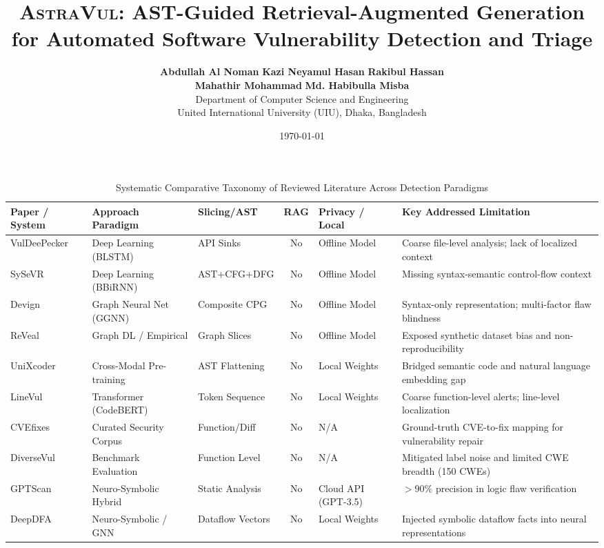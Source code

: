\documentclass[10pt,twocolumn]{article}
\title{\textbf{\Large \textsc{AstraVul}: AST-Guided Retrieval-Augmented Generation for Automated Software Vulnerability Detection and Triage}}
\author{
    \textbf{Abdullah Al Noman} \quad \textbf{Kazi Neyamul Hasan} \quad \textbf{Rakibul Hassan}\\
    \textbf{Mahathir Mohammad} \quad \textbf{Md. Habibulla Misba}\\[3pt]
    Department of Computer Science and Engineering\\
    United International University (UIU), Dhaka, Bangladesh
}
\date{\today}
\begin{document}
\maketitle

\begin{table}[!t]
\centering
\caption{Systematic Comparative Taxonomy of Reviewed Literature Across Detection Paradigms}
\vspace{3pt}
\scriptsize
\setlength{\tabcolsep}{3.5pt}
\begin{tabular}{|p{2.5cm}|p{3.2cm}|p{2.0cm}|c|p{2.1cm}|p{5.6cm}|}
\hline
\textbf{Paper / System} & \textbf{Approach Paradigm} & \textbf{Slicing/AST} & \textbf{RAG} & \textbf{Privacy / Local} & \textbf{Key Addressed Limitation} \\
\hline
VulDeePecker~\cite{li2018vuldeepecker} & Deep Learning (BLSTM) & API Sinks & No & Offline Model & Coarse file-level analysis; lack of localized context \\
SySeVR~\cite{li2021sysevr} & Deep Learning (BBiRNN) & AST+CFG+DFG & No & Offline Model & Missing syntax-semantic control-flow context \\
Devign~\cite{zhou2019devign} & Graph Neural Net (GGNN) & Composite CPG & No & Offline Model & Syntax-only representation; multi-factor flaw blindness \\
ReVeal~\cite{chakraborty2021reveal} & Graph DL / Empirical & Graph Slices & No & Offline Model & Exposed synthetic dataset bias and non-reproducibility \\
UniXcoder~\cite{guo2022unixcoder} & Cross-Modal Pre-training & AST Flattening & No & Local Weights & Bridged semantic code and natural language embedding gap \\
LineVul~\cite{fu2022linevul} & Transformer (CodeBERT) & Token Sequence & No & Local Weights & Coarse function-level alerts; line-level localization \\
CVEfixes~\cite{bhandari2021cvefixes} & Curated Security Corpus & Function/Diff & No & N/A & Ground-truth CVE-to-fix mapping for vulnerability repair \\
DiverseVul~\cite{chen2023diversevul} & Benchmark Evaluation & Function Level & No & N/A & Mitigated label noise and limited CWE breadth (150 CWEs) \\
GPTScan~\cite{sun2024gptscan} & Neuro-Symbolic Hybrid & Static Analysis & No & Cloud API (GPT-3.5) & $>90\%$ precision in logic flaw verification \\
DeepDFA~\cite{steenhoek2024deepdfa} & Neuro-Symbolic / GNN & Dataflow Vectors & No & Local Weights & Injected symbolic dataflow facts into neural representations \\

\end{tabular}
\end{table}
\end{document}
